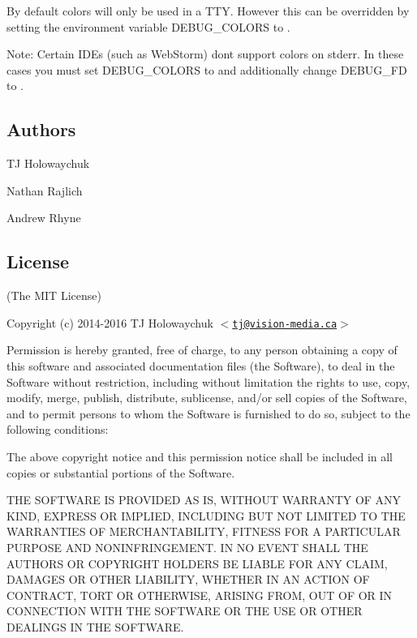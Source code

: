 By default colors will only be used in a T\+TY. However this can be overridden by setting the environment variable {\ttfamily D\+E\+B\+U\+G\+\_\+\+C\+O\+L\+O\+RS} to {}.

Note\+: Certain I\+D\+Es (such as Web\+Storm) don\textquotesingle{}t support colors on stderr. In these cases you must set {\ttfamily D\+E\+B\+U\+G\+\_\+\+C\+O\+L\+O\+RS} to {} and additionally change {\ttfamily D\+E\+B\+U\+G\+\_\+\+FD} to {}.

\subsection*{Authors}


\begin{DoxyItemize}
\item TJ Holowaychuk
\item Nathan Rajlich
\item Andrew Rhyne
\end{DoxyItemize}

\subsection*{License}

(The M\+IT License)

Copyright (c) 2014-\/2016 TJ Holowaychuk $<$\href{mailto:tj@vision-media.ca}{\tt tj@vision-\/media.\+ca}$>$

Permission is hereby granted, free of charge, to any person obtaining a copy of this software and associated documentation files (the \textquotesingle{}Software\textquotesingle{}), to deal in the Software without restriction, including without limitation the rights to use, copy, modify, merge, publish, distribute, sublicense, and/or sell copies of the Software, and to permit persons to whom the Software is furnished to do so, subject to the following conditions\+:

The above copyright notice and this permission notice shall be included in all copies or substantial portions of the Software.

T\+HE S\+O\+F\+T\+W\+A\+RE IS P\+R\+O\+V\+I\+D\+ED \textquotesingle{}AS IS\textquotesingle{}, W\+I\+T\+H\+O\+UT W\+A\+R\+R\+A\+N\+TY OF A\+NY K\+I\+ND, E\+X\+P\+R\+E\+SS OR I\+M\+P\+L\+I\+ED, I\+N\+C\+L\+U\+D\+I\+NG B\+UT N\+OT L\+I\+M\+I\+T\+ED TO T\+HE W\+A\+R\+R\+A\+N\+T\+I\+ES OF M\+E\+R\+C\+H\+A\+N\+T\+A\+B\+I\+L\+I\+TY, F\+I\+T\+N\+E\+SS F\+OR A P\+A\+R\+T\+I\+C\+U\+L\+AR P\+U\+R\+P\+O\+SE A\+ND N\+O\+N\+I\+N\+F\+R\+I\+N\+G\+E\+M\+E\+NT. IN NO E\+V\+E\+NT S\+H\+A\+LL T\+HE A\+U\+T\+H\+O\+RS OR C\+O\+P\+Y\+R\+I\+G\+HT H\+O\+L\+D\+E\+RS BE L\+I\+A\+B\+LE F\+OR A\+NY C\+L\+A\+IM, D\+A\+M\+A\+G\+ES OR O\+T\+H\+ER L\+I\+A\+B\+I\+L\+I\+TY, W\+H\+E\+T\+H\+ER IN AN A\+C\+T\+I\+ON OF C\+O\+N\+T\+R\+A\+CT, T\+O\+RT OR O\+T\+H\+E\+R\+W\+I\+SE, A\+R\+I\+S\+I\+NG F\+R\+OM, O\+UT OF OR IN C\+O\+N\+N\+E\+C\+T\+I\+ON W\+I\+TH T\+HE S\+O\+F\+T\+W\+A\+RE OR T\+HE U\+SE OR O\+T\+H\+ER D\+E\+A\+L\+I\+N\+GS IN T\+HE S\+O\+F\+T\+W\+A\+RE. 